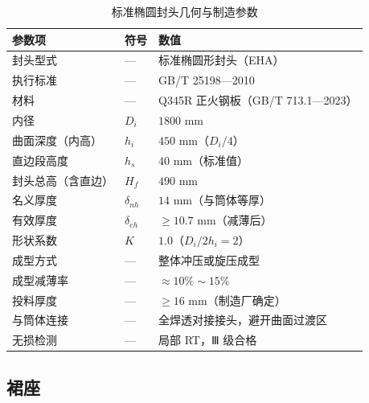 \begin{table}[htbp]
  \centering
  \caption{标准椭圆封头几何与制造参数}
  \label{tab:cad-head}
  \small\renewcommand{\arraystretch}{1.15}
  \setlength{\tabcolsep}{10pt}
  \begin{tabularx}{\textwidth}{@{}l l l @{}}
    \toprule
    \textbf{参数项} & \textbf{符号} & \textbf{数值} \\
    \midrule
    封头型式                & —        & 标准椭圆形封头（EHA） \\
    执行标准                & —        & GB/T 25198—2010 \\
    材料                    & —        & Q345R 正火钢板（GB/T 713.1—2023） \\
    内径                    & $D_i$    & $1800$ mm \\
    曲面深度（内高）        & $h_i$    & $450$ mm（$D_i/4$） \\
    直边段高度              & $h_s$    & $40$ mm（标准值） \\
    封头总高（含直边）      & $H_f$    & $490$ mm \\
    名义厚度                & $\delta_{nh}$ & $14$ mm（与筒体等厚） \\
    有效厚度                & $\delta_{eh}$ & $\ge 10.7$ mm（减薄后） \\
    形状系数                & $K$      & $1.0$（$D_i/2h_i = 2$） \\
    成型方式                & —        & 整体冲压或旋压成型 \\
    成型减薄率              & —        & $\approx 10\%\sim15\%$ \\
    投料厚度                & —        & $\ge 16$ mm（制造厂确定） \\
    与筒体连接              & —        & 全焊透对接接头，避开曲面过渡区 \\
    无损检测                & —        & 局部 RT，Ⅲ 级合格 \\
    \bottomrule
  \end{tabularx}
\end{table}

\subsection{裙座}

